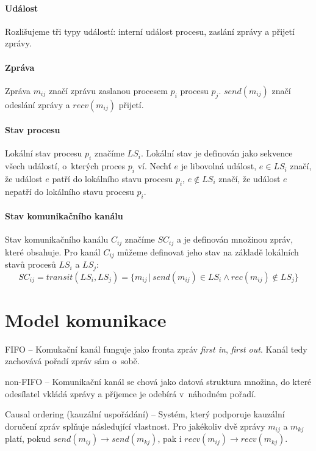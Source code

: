 \paragraph*{Událost} Rozlišujeme tři typy událostí: interní událost procesu, zaslání zprávy a přijetí zprávy.

\paragraph*{Zpráva} Zpráva $m_{ij}$ značí zprávu zaslanou procesem $p_i$ procesu $p_j$. $send(m_{ij})$ značí odeslání zprávy a $recv(m_{ij})$ přijetí.

\paragraph*{Stav procesu} Lokální stav procesu $p_i$ značíme $LS_i$. Lokální stav je definován jako sekvence všech událostí, o~kterých proces $p_i$ ví. Nechť $e$ je libovolná událost, $e \in LS_i$ značí, že událost $e$ patří do lokálního stavu procesu $p_i$, $e \not\in LS_i$ značí, že událost $e$ nepatří do lokálního stavu procesu $p_i$.

\paragraph*{Stav komunikačního kanálu} Stav komunikačního kanálu $C_{ij}$ značíme $SC_{ij}$ a je definován množinou zpráv, které obsahuje. Pro kanál $C_{ij}$ můžeme definovat jeho stav na základě lokálních stavů procesů $LS_i$ a $LS_j$: $$
    SC_{ij} = transit(LS_i, LS_j) = \{ m_{ij} \,|\, send(m_{ij}) \in LS_i \land rec(m_{ij}) \not\in LS_j \}
$$


\section{Model komunikace}

\begin{compactitem}
    \item FIFO -- Komukační kanál funguje jako fronta zpráv \textit{first in}, \textit{first out}. Kanál tedy zachovává pořadí zpráv sám o~sobě.

    \item non-FIFO -- Komunikační kanál se chová jako datová struktura množina, do které odesílatel vkládá zprávy a příjemce je odebírá v~náhodném pořadí.

    \item Causal ordering (kauzální uspořádání) -- Systém, který podporuje kauzální doručení zpráv splňuje následující vlastnost. Pro jakékoliv dvě zprávy $m_{ij}$ a $m_{kj}$ platí, pokud $send(m_{ij}) \rightarrow send(m_{kj})$, pak i $recv(m_{ij}) \rightarrow recv(m_{kj})$.
\end{compactitem}

